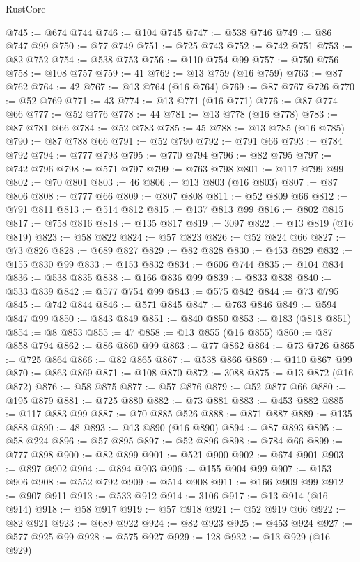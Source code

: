 \begin{lexlean}{RustCore}
\begin{coremodule}
@745 := @674 @744
@746 := @104 @745
@747 := @538 @746
@749 := @86 @747 @99
@750 := @77 @749
@751 := @725 @743
@752 := @742 @751
@753 := @82 @752
@754 := @538 @753
@756 := @110 @754 @99
@757 := @750 @756
@758 := @108 @757
@759 := 41
@762 := @13 @759 (@16 @759)
@763 := @87 @762
@764 := 42
@767 := @13 @764 (@16 @764)
@769 := @87 @767 @726
@770 := @52 @769
@771 := 43
@774 := @13 @771 (@16 @771)
@776 := @87 @774 @66
@777 := @52 @776
@778 := 44
@781 := @13 @778 (@16 @778)
@783 := @87 @781 @66
@784 := @52 @783
@785 := 45
@788 := @13 @785 (@16 @785)
@790 := @87 @788 @66
@791 := @52 @790
@792 := @791 @66
@793 := @784 @792
@794 := @777 @793
@795 := @770 @794
@796 := @82 @795
@797 := @742 @796
@798 := @571 @797
@799 := @763 @798
@801 := @117 @799 @99
@802 := @70 @801
@803 := 46
@806 := @13 @803 (@16 @803)
@807 := @87 @806
@808 := @777 @66
@809 := @807 @808
@811 := @52 @809 @66
@812 := @791 @811
@813 := @514 @812
@815 := @137 @813 @99
@816 := @802 @815
@817 := @758 @816
@818 := @135 @817
@819 := 3097
@822 := @13 @819 (@16 @819)
@823 := @58 @822
@824 := @57 @823
@826 := @52 @824 @66
@827 := @73 @826
@828 := @689 @827
@829 := @82 @828
@830 := @453 @829
@832 := @155 @830 @99
@833 := @153 @832
@834 := @606 @744
@835 := @104 @834
@836 := @538 @835
@838 := @166 @836 @99
@839 := @833 @838
@840 := @533 @839
@842 := @577 @754 @99
@843 := @575 @842
@844 := @73 @795
@845 := @742 @844
@846 := @571 @845
@847 := @763 @846
@849 := @594 @847 @99
@850 := @843 @849
@851 := @840 @850
@853 := @183 (@818 @851)
@854 := @8 @853
@855 := 47
@858 := @13 @855 (@16 @855)
@860 := @87 @858 @794
@862 := @86 @860 @99
@863 := @77 @862
@864 := @73 @726
@865 := @725 @864
@866 := @82 @865
@867 := @538 @866
@869 := @110 @867 @99
@870 := @863 @869
@871 := @108 @870
@872 := 3088
@875 := @13 @872 (@16 @872)
@876 := @58 @875
@877 := @57 @876
@879 := @52 @877 @66
@880 := @195 @879
@881 := @725 @880
@882 := @73 @881
@883 := @453 @882
@885 := @117 @883 @99
@887 := @70 @885 @526
@888 := @871 @887
@889 := @135 @888
@890 := 48
@893 := @13 @890 (@16 @890)
@894 := @87 @893
@895 := @58 @224
@896 := @57 @895
@897 := @52 @896
@898 := @784 @66
@899 := @777 @898
@900 := @82 @899
@901 := @521 @900
@902 := @674 @901
@903 := @897 @902
@904 := @894 @903
@906 := @155 @904 @99
@907 := @153 @906
@908 := @552 @792
@909 := @514 @908
@911 := @166 @909 @99
@912 := @907 @911
@913 := @533 @912
@914 := 3106
@917 := @13 @914 (@16 @914)
@918 := @58 @917
@919 := @57 @918
@921 := @52 @919 @66
@922 := @82 @921
@923 := @689 @922
@924 := @82 @923
@925 := @453 @924
@927 := @577 @925 @99
@928 := @575 @927
@929 := 128
@932 := @13 @929 (@16 @929)

\end{coremodule}
\end{lexlean}

